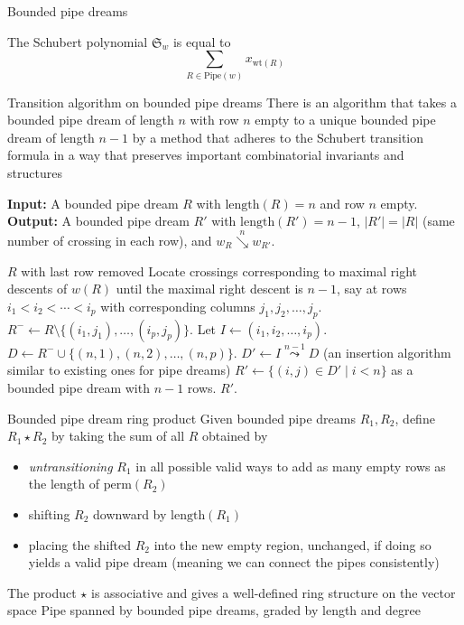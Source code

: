 \documentclass[aspectratio=169]{beamer}
\newcommand{\dcoma}{\mathcal{DS}}
\newcommand{\RC}{\mathrm{Pipe}}
\newcommand{\hr}{\mathrm{length}}
\newcommand{\downvar}[1]{\stackrel{#1}{\searrow}}
\newcommand{\wof}[1]{w_{#1}}
\newcommand{\xleadsto}[2][]{\overset{#2}{\leadsto}}
\newcommand{\ins}[2]{{#2\xleadsto{#1}}}
\begin{document}
\begin{frame}{Bounded pipe dreams}
\begin{theorem}
The Schubert polynomial $\mathfrak{S}_w$ is equal to
$$\sum_{R\in\RC(w)}x_{\mathrm{wt}(R)}$$
\end{theorem}


\end{frame}

\begin{frame}{Transition algorithm on bounded pipe dreams}
  There is an algorithm that takes a bounded pipe dream of length $n$ with row $n$ empty to a unique bounded pipe dream of length $n-1$
by a method that adheres to the Schubert transition formula in a way that preserves important combinatorial invariants and structures
\begin{center}
  {\scriptsize
  \begin{algorithmic}
		\State \textbf{Input:} A bounded pipe dream $R$ with $\hr(R)=n$ and row $n$ empty.
		\State \textbf{Output:} A bounded  pipe dream $R'$ with $\hr(R')=n-1$, $|R'|=|R|$ (same number of crossing in each row), and $\wof{R}\downvar{n} \wof{R'}$.
		
		\State \Return $R$ with last row removed
		\Else
		\State Locate crossings corresponding to maximal right descents of $w(R)$ until the maximal right descent is $n-1$, say at rows $i_1 < i_2 < \cdots < i_p$ with corresponding columns $j_1, j_2, \ldots, j_p$.
		\State $R^- \gets R \setminus \{(i_1, j_1), \ldots, (i_p, j_p)\}$.
		\State Let $I \gets (i_1, i_2, \ldots, i_p)$.
		\State $D \gets R^- \cup \{(n, 1), (n, 2), \ldots, (n, p)\}$.
		\State $D' \gets \ins{n-1}{I} D$ (an insertion algorithm similar to existing ones for pipe dreams)
		\State $R' \gets \{(i, j) \in D' \mid i < n\}$ as a bounded pipe dream with $n-1$ rows.
		\State \Return $R'$.
		\EndIf
	\end{algorithmic}
  }
\end{center}
\end{frame}

\begin{frame}{Bounded pipe dream ring product}
Given bounded pipe dreams $R_1,R_2$, define $R_1\star R_2$ by taking the sum of all $R$ obtained by
\begin{itemize}
  \item \emph{untransitioning} $R_1$ in all possible valid ways to add as many empty rows as the length of $\mathrm{perm}(R_2)$
  \item shifting $R_2$ downward by $\mathrm{length}(R_1)$
  \item placing the shifted $R_2$ into the new empty region, unchanged, if doing so yields a valid pipe dream (meaning we can connect the pipes consistently)
\end{itemize}
\begin{theorem}[S, 2026+]
The product $\star$ is associative and gives a well-defined ring structure on the vector space $\RC$ spanned by bounded pipe dreams, graded by length and degree
\end{theorem}
\end{frame}
\end{document}
